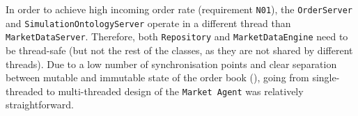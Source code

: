 In order to achieve high incoming order rate (requirement \texttt{N01}), the \texttt{OrderServer} and \texttt{SimulationOntologyServer} operate in a different thread than \texttt{MarketDataServer}. Therefore, both \texttt{Repository} and \texttt{MarketDataEngine} need to be thread-safe (but not the rest of the classes, as they are not shared by different threads). Due to a low number of synchronisation points and clear separation between mutable and immutable state of the order book (), going from single-threaded to multi-threaded design of the \texttt{Market Agent} was relatively straightforward.
